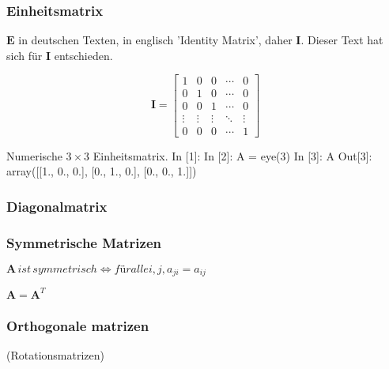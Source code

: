 \subsubsection*{Einheitsmatrix}

$\mathbf{E}$ in deutschen Texten, in englisch 'Identity Matrix', daher $\mathbf{I}$. Dieser Text hat sich für $\mathbf{I}$ entschieden.

\begin{equation}
\mathbf{I} =
\begin{bmatrix}
1 & 0 & 0 & \cdots & 0 \\
0 & 1 & 0 & \cdots & 0 \\
0 & 0 & 1 & \cdots & 0 \\
\vdots & \vdots & \vdots & \ddots & \vdots \\
0 & 0 & 0 & \cdots & 1
\end{bmatrix}
\end{equation} 


\begin{python}{Numerische $3\times 3$ Einheitsmatrix.}
In [1]: %
In [2]: A = eye(3)
In [3]: A
Out[3]:
array([[1., 0., 0.],
       [0., 1., 0.],
       [0., 0., 1.]])
\end{python}


\subsubsection{Diagonalmatrix}

\subsubsection{Symmetrische Matrizen}

$\mathbf{A} \, ist \, symmetrisch \iff für alle i,j, a_{ji} = a_{ij}$

$\mathbf{A} = \mathbf{A}^T$



\subsubsection{Orthogonale matrizen}
(Rotationsmatrizen)

